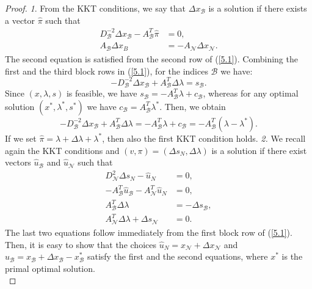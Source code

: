 \documentclass[a4paper,10 pt,titlepage,twoside]{report}
\theoremstyle{plain}
\theoremstyle{definition}
\theoremstyle{remark}
\begin{document}
\begin{proof}
	\textit{1}. From the KKT conditions, we say that $\Delta x_{\mathcal{B}}$ is a solution if there exists a vector $\hat{\pi}$ such that
	\begin{align*}
	D_{\mathcal{B}}^{-2}\Delta x_{\mathcal{B}}-A_{\mathcal{B}}^{T}\hat{\pi}&= 0,\\
	A_{\mathcal{B}}\Delta x_{B}&= -A_{\mathcal{N}}\Delta x_{\mathcal{N}}.
	\end{align*}
	The second equation is satisfied from the second row of (\ref{5.1}). Combining the first and the third block rows in (\ref{5.1}), for the indices $\mathcal{B}$ we have:
	\begin{equation*}
	-D_{\mathcal{B}}^{-2}\Delta x_{\mathcal{B}} + A_{\mathcal{B}}^{T}\Delta \lambda = s_{\mathcal{B}}.
	\end{equation*}
	Since $(x, \lambda, s)$ is feasible, we have $s_{\mathcal{B}}= -A_{\mathcal{B}}^{T}\lambda+ c_{\mathcal{B}}$, whereas for any optimal solution $(x^{*}, \lambda^{*}, s^{*})$ we have $c_{\mathcal{B}}= A_{\mathcal{B}}^{T}\lambda^{*}$. Then, we obtain
	\begin{equation*}
	-D_{\mathcal{B}}^{-2}\Delta x_{\mathcal{B}} + A_{\mathcal{B}}^{T}\Delta \lambda = -A_{\mathcal{B}}^{T}\lambda+ c_{\mathcal{B}} = -A_{\mathcal{B}}^{T}(\lambda - \lambda^{*}). 
	\end{equation*}
	If we set $\hat{\pi} = \lambda + \Delta\lambda + \lambda^{*}$, then also the first KKT condition holds.\newline
	\textit{2.} We recall again the KKT conditions and $(v,\pi)=(\Delta s_{N},\Delta\lambda)$ is a solution if there exist vectors $\hat{u}_{\mathcal{B}}$ and $\hat{u}_{\mathcal{N}}$ such that
	\begin{align*}
	D_{\mathcal{N}}^{2}\Delta s_{N}-\hat{u}_{N}&=0,\\
	-A_{\mathcal{B}}^{T}\hat{u}_{\mathcal{B}}-A_{\mathcal{N}}^{T}\hat{u}_{N}&=0,\\
	A_{\mathcal{B}}^{T}\Delta \lambda &= -\Delta s_{\mathcal{B}},\\
	A_{\mathcal{N}}^{T}\Delta\lambda + \Delta s_{\mathcal{N}} &=0. 
	\end{align*}
	The last two equations follow immediately from the first block row of (\ref{5.1}).\\
	Then, it is easy to show that the choices $\hat{u}_{N}= x_{\mathcal{N}}+\Delta x_{\mathcal{N}}$ and $\hat{u}_{\mathcal{B}}=x_{\mathcal{B}}+\Delta x_{\mathcal{B}}-x_{\mathcal{B}}^{*}$ satisfy the first and the second equations, where $x^{*}$ is the primal optimal solution.\\

\end{proof}
\end{document}
